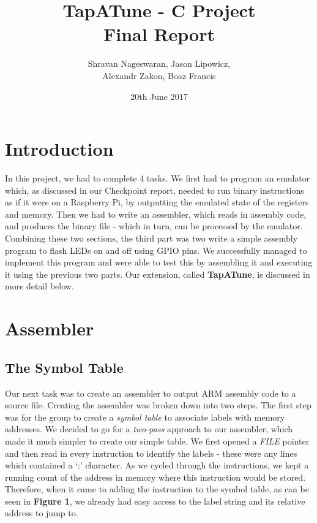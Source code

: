 \documentclass[11pt]{article}
\begin{document}
\title{\textbf{TapATune - C Project \\Final Report}}
\author{Shravan Nageswaran, Jason Lipowicz,\\ Alexandr Zakon, Boaz Francis}
\date{20th June 2017}

\maketitle

\vspace{0.1in}

\section{Introduction}

In this project, we had to complete 4 tasks. We first had to program an emulator which, as discussed in our Checkpoint report, needed to run binary instructions as if it were on a Raspberry Pi, by outputting the emulated state of the registers and memory. Then we had to write an assembler, which reads in assembly code, and produces the binary file - which in turn, can be processed by the emulator. Combining these two sections, the third part was two write a simple assembly program to flash LEDs on and off using GPIO pins. We successfully managed to implement this program and were able to test this by assembling it and executing it using the previous two parts. Our extension, called \textbf{TapATune}, is discussed in more detail below.

\section{Assembler}

\subsection{The Symbol Table}

Our next task was to create an assembler to output ARM assembly code to a source file. Creating the assembler was broken down into two steps. The first step was for the group to create a \emph{symbol table} to associate labels with memory addresses. We decided to go for a \emph{two-pass} approach to our assembler, which made it much simpler to create our simple table. We first opened a \emph{FILE} pointer and then read in every instruction to identify the labels - these were any lines which contained a `:' character. As we cycled through the instructions, we kept a running count of the address in memory where this instruction would be stored. Therefore, when it came to adding the instruction to the symbol table, as can be seen in \textbf{Figure 1}, we already had easy access to the label string and its relative address to jump to. \\
\end{document}
